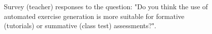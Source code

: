 \documentclass{l4proj}
\begin{document}
\begin{appendices}
\begin{figure}[h]
    \caption{Survey (teacher) responses to the question: "Do you think the use of automated exercise generation is more suitable for formative (tutorials) or summative (class test) assessments?".}
    \label{fig:t_summative_formative} 
\end{figure}
\end{appendices}






\end{document}
